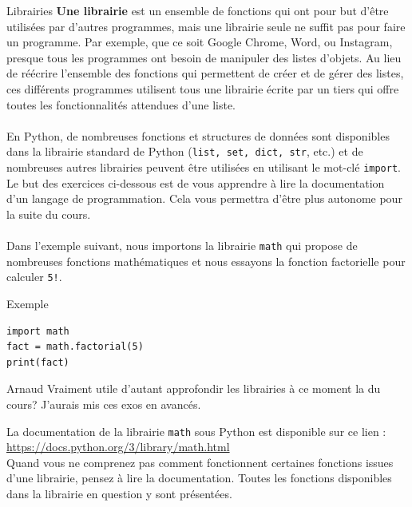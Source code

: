 \begin{section}{Librairies}
    \textbf{Une librairie} est un ensemble de fonctions qui ont pour but d'être utilisées par d'autres programmes, mais une librairie seule ne suffit pas pour faire un programme. Par exemple, que ce soit Google Chrome, Word, ou Instagram, presque tous les programmes ont besoin de manipuler des listes d'objets. Au lieu de réécrire l'ensemble des fonctions qui permettent de créer et de gérer des listes, ces différents programmes utilisent tous une librairie écrite par un tiers qui offre toutes les fonctionnalités attendues d'une liste.
\\\\
En Python, de nombreuses fonctions et structures de données sont disponibles dans la librairie standard de Python (\lstinline{list, set, dict, str}, etc.) et de nombreuses autres librairies peuvent être utilisées en utilisant le mot-clé \lstinline{import}. Le but des exercices ci-dessous est de vous apprendre à lire la documentation d'un langage de programmation. Cela vous permettra d'être plus autonome pour la suite du cours.
\\\\
Dans l'exemple suivant, nous importons la librairie \lstinline{math} qui propose de nombreuses fonctions mathématiques et nous essayons la fonction factorielle pour calculer \lstinline{5!}.
\begin{Example}{\faTerminal Exemple}
    \begin{lstlisting}
import math
fact = math.factorial(5)
print(fact)\end{lstlisting}
\end{Example}
\begin{note}{Arnaud}
    Vraiment utile d'autant approfondir les librairies à ce moment la du cours? J'aurais mis ces exos en avancés.
    \end{note}

\begin{conseil}
	La documentation de la librairie \lstinline{math} sous Python est disponible sur ce lien : \url{https://docs.python.org/3/library/math.html} \\
Quand vous ne comprenez pas comment fonctionnent certaines fonctions issues d'une librairie, pensez à lire la documentation. Toutes les fonctions disponibles dans la librairie en question y sont présentées.


\end{conseil}
\end{section}
